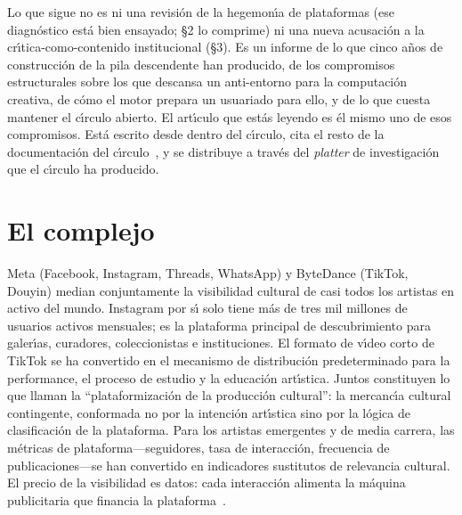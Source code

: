 \documentclass[10pt,letterpaper,twocolumn]{article}
\begin{document}
Lo que sigue no es ni una revisi\'{o}n de la hegemon\'{\i}a de plataformas (ese diagn\'{o}stico est\'{a} bien ensayado; \S2 lo comprime) ni una nueva acusaci\'{o}n a la cr\'{\i}tica-como-contenido institucional (\S3). Es un informe de lo que cinco a\~{n}os de construcci\'{o}n de la pila descendente han producido, de los compromisos estructurales sobre los que descansa un anti-entorno para la computaci\'{o}n creativa, de c\'{o}mo el motor prepara un usuariado para ello, y de lo que cuesta mantener el c\'{\i}rculo abierto. El art\'{\i}culo que est\'{a}s leyendo es \'{e}l mismo uno de esos compromisos. Est\'{a} escrito desde dentro del c\'{\i}rculo, cita el resto de la documentaci\'{o}n del c\'{\i}rculo~\citep{scudder2026ac, scudder2026kidlisp, scudder2026notepat, scudder2026os, scudder2026pieces, scudder2026urltradition, scudder2026archaeology, scudder2026whistlegraph, scudder2026goodiepal}, y se distribuye a trav\'{e}s del \emph{platter} de investigaci\'{o}n que el c\'{\i}rculo ha producido.

\section{El complejo}

Meta (Facebook, Instagram, Threads, WhatsApp) y ByteDance (TikTok, Douyin) median conjuntamente la visibilidad cultural de casi todos los artistas en activo del mundo. Instagram por s\'{\i} solo tiene m\'{a}s de tres mil millones de usuarios activos mensuales; es la plataforma principal de descubrimiento para galer\'{\i}as, curadores, coleccionistas e instituciones. El formato de v\'{\i}deo corto de TikTok se ha convertido en el mecanismo de distribuci\'{o}n predeterminado para la performance, el proceso de estudio y la educaci\'{o}n art\'{\i}stica. Juntos constituyen lo que \citet{nieborg2018platformization} llaman la ``plataformizaci\'{o}n de la producci\'{o}n cultural'': la mercanc\'{\i}a cultural contingente, conformada no por la intenci\'{o}n art\'{\i}stica sino por la l\'{o}gica de clasificaci\'{o}n de la plataforma. Para los artistas emergentes y de media carrera, las m\'{e}tricas de plataforma---seguidores, tasa de interacci\'{o}n, frecuencia de publicaciones---se han convertido en indicadores sustitutos de relevancia cultural. El precio de la visibilidad es datos: cada interacci\'{o}n alimenta la m\'{a}quina publicitaria que financia la plataforma~\citep{zuboff2019surveillance, srnicek2017platform}.
\end{document}
